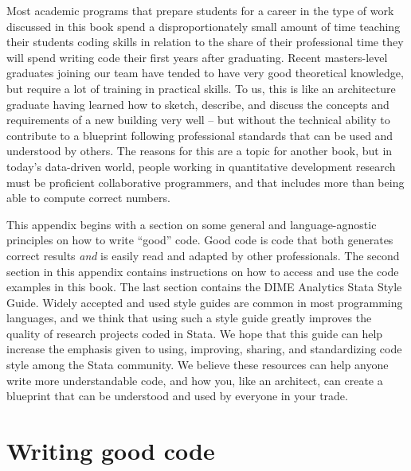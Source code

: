 
\begin{fullwidth}

Most academic programs that prepare students for a career
in the type of work discussed in this book
spend a disproportionately small amount of time 
teaching their students coding skills
in relation to the share of their professional time 
they will spend writing code
their first years after graduating.
Recent masters-level graduates joining our team
have tended to have very good theoretical knowledge,
but require a lot of training in practical skills.
To us, this is like an architecture graduate having learned
how to sketch, describe, and discuss
the concepts and requirements of a new building very well --
but without the technical ability
to contribute to a blueprint following professional standards
that can be used and understood by others.
The reasons for this are a topic for another book,
but in today's data-driven world,
people working in quantitative development research 
must be proficient collaborative programmers,
and that includes more than being able to compute correct numbers.

This appendix begins with a section on some general and language-agnostic
principles on how to write ``good'' code. 
Good code is code that both generates correct results \textit{and} 
is easily read and adapted by other professionals.
The second section in this appendix contains instructions
on how to access and use the code examples in this book.
The last section contains the DIME Analytics Stata Style Guide.
Widely accepted and used style guides are common in most programming languages,
and we think that using such a style guide greatly improves the quality
of research projects coded in Stata.
We hope that this guide can help increase the emphasis
given to using, improving, sharing, and standardizing code style 
among the Stata community.
We believe these resources can help anyone write more understandable code,
and how you, like an architect,
can create a blueprint that can be understood and used 
by everyone in your trade.

\end{fullwidth}


\section{Writing good code}


